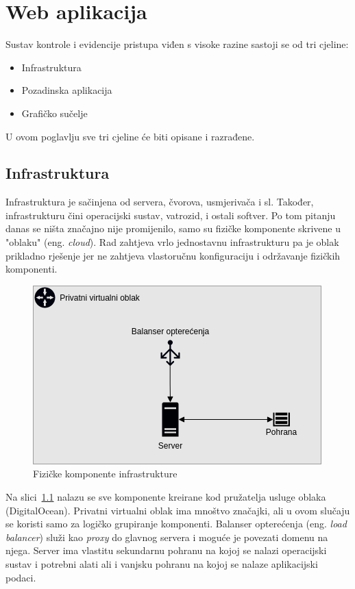 \chapter{Web aplikacija}

Sustav kontrole i evidencije pristupa viđen s visoke razine sastoji se od tri cjeline:
\begin{itemize}
    \item Infrastruktura
    \item Pozadinska aplikacija
    \item Grafičko sučelje
\end{itemize}

U ovom poglavlju sve tri cjeline će biti opisane i razrađene.

\section{Infrastruktura}

Infrastruktura je sačinjena od servera, čvorova, usmjerivača i sl.
Također, infrastrukturu čini operacijski sustav, vatrozid, i ostali softver\cite{ibm-infrastructure}.
Po tom pitanju danas se ništa značajno nije promijenilo, samo su fizičke komponente skrivene u "oblaku" (eng. \textit{cloud}).
Rad zahtjeva vrlo jednostavnu infrastrukturu pa je oblak prikladno rješenje jer ne zahtjeva vlastoručnu konfiguraciju i održavanje fizičkih komponenti.

\begin{figure}[h!]
    \centering
    \includegraphics[scale=0.7]{images/infrastructure}
    \caption{Fizičke komponente infrastrukture}
    \label{fig:physical-infrastructure}
\end{figure}

Na slici~\ref{fig:physical-infrastructure} nalazu se sve komponente kreirane kod pružatelja usluge oblaka (DigitalOcean).
Privatni virtualni oblak ima mnoštvo značajki, ali u ovom slučaju se koristi samo za logičko grupiranje komponenti.
Balanser opterećenja (eng. \textit{load balancer}) služi kao \textit{proxy} do glavnog servera i moguće je povezati domenu na njega.
Server ima vlastitu sekundarnu pohranu na kojoj se nalazi operacijski sustav i potrebni alati ali i vanjsku pohranu na kojoj se nalaze aplikacijski podaci.

